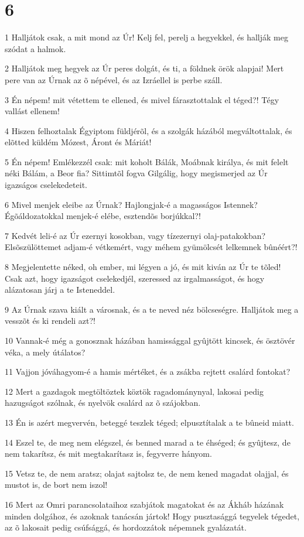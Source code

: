 \chapter{6}

\par 1 Halljátok csak, a mit mond az Úr! Kelj fel, perelj a hegyekkel, és hallják meg szódat a halmok.
\par 2 Halljátok meg hegyek az Úr peres dolgát, és ti, a földnek örök alapjai! Mert pere van az Úrnak az õ népével, és az Izráellel is perbe száll.
\par 3 Én népem! mit vétettem te ellened, és mivel fárasztottalak el téged?! Tégy vallást ellenem!
\par 4 Hiszen felhoztalak Égyiptom füldjérõl, és a szolgák házából megváltottalak, és elõtted küldém Mózest, Áront és Máriát!
\par 5 Én népem! Emlékezzél csak: mit koholt Bálák, Moábnak királya, és mit felelt néki Bálám, a Beor fia? Sittimtõl fogva Gilgálig, hogy megismerjed az Úr igazságos cselekedeteit.
\par 6 Mivel menjek eleibe az Úrnak? Hajlongjak-é a magasságos Istennek? Égõáldozatokkal menjek-é elébe, esztendõs borjúkkal?!
\par 7 Kedvét leli-é az Úr ezernyi kosokban, vagy tízezernyi olaj-patakokban? Elsõszülöttemet adjam-é vétkemért, vagy méhem gyümölcsét lelkemnek bûnéért?!
\par 8 Megjelentette néked, oh ember, mi légyen a jó, és mit kiván az Úr te tõled! Csak azt, hogy igazságot cselekedjél, szeressed az irgalmasságot, és hogy alázatosan járj a te Isteneddel.
\par 9 Az Úrnak szava kiált a városnak, és a te neved néz bölcseségre. Halljátok meg a vesszõt és ki rendeli azt?!
\par 10 Vannak-é még a gonosznak házában hamissággal gyûjtött kincsek, és ösztövér véka, a mely útálatos?
\par 11 Vajjon jóváhagyom-é a hamis mértéket, és a zsákba rejtett csalárd fontokat?
\par 12 Mert a gazdagok megtöltöztek köztök ragadománynyal, lakosai pedig hazugságot szólnak, és nyelvök csalárd az õ szájokban.
\par 13 Én is azért megvervén, beteggé teszlek téged; elpusztítalak a te bûneid miatt.
\par 14 Eszel te, de meg nem elégszel, és benned marad a te éhséged; és gyûjtesz, de nem takarítsz, és mit megtakarítasz is, fegyverre hányom.
\par 15 Vetsz te, de nem aratsz; olajat sajtolsz te, de nem kened magadat olajjal, és mustot is, de bort nem iszol!
\par 16 Mert az Omri parancsolataihoz szabjátok magatokat és az Ákháb házának minden dolgához, és azoknak tanácsán jártok! Hogy pusztasággá tegyelek tégedet, az õ lakosait pedig csúfsággá, és hordozzátok népemnek gyalázatát.

